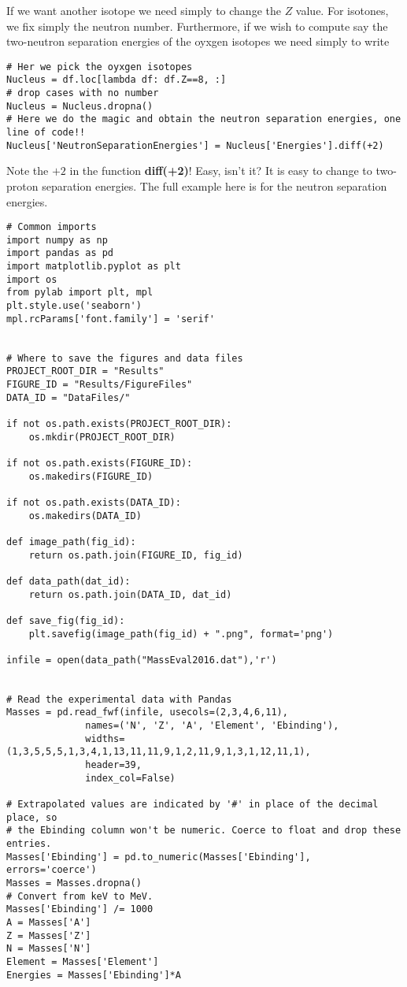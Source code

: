 \documentclass[%
oneside,                 %
final,                   %
10pt]{article}
\newenvironment{doconceexercise}{}{}
\begin{document}
\begin{doconceexercise}
If we want another isotope we need simply to change the $Z$ value. For isotones, we fix simply the neutron number. Furthermore, if we wish to compute say the two-neutron separation energies of the oyxgen isotopes we need simply to write 
\begin{verbatim}
# Her we pick the oyxgen isotopes
Nucleus = df.loc[lambda df: df.Z==8, :]
# drop cases with no number
Nucleus = Nucleus.dropna()
# Here we do the magic and obtain the neutron separation energies, one line of code!!
Nucleus['NeutronSeparationEnergies'] = Nucleus['Energies'].diff(+2)
\end{verbatim}
Note the $+2$ in the function \textbf{diff(+2)}!  Easy, isn't it? It is easy to change to two-proton separation energies. The full example here is for the neutron separation energies.

\begin{verbatim}
# Common imports
import numpy as np
import pandas as pd
import matplotlib.pyplot as plt
import os
from pylab import plt, mpl
plt.style.use('seaborn')
mpl.rcParams['font.family'] = 'serif'


# Where to save the figures and data files
PROJECT_ROOT_DIR = "Results"
FIGURE_ID = "Results/FigureFiles"
DATA_ID = "DataFiles/"

if not os.path.exists(PROJECT_ROOT_DIR):
    os.mkdir(PROJECT_ROOT_DIR)

if not os.path.exists(FIGURE_ID):
    os.makedirs(FIGURE_ID)

if not os.path.exists(DATA_ID):
    os.makedirs(DATA_ID)

def image_path(fig_id):
    return os.path.join(FIGURE_ID, fig_id)

def data_path(dat_id):
    return os.path.join(DATA_ID, dat_id)

def save_fig(fig_id):
    plt.savefig(image_path(fig_id) + ".png", format='png')

infile = open(data_path("MassEval2016.dat"),'r')


# Read the experimental data with Pandas
Masses = pd.read_fwf(infile, usecols=(2,3,4,6,11),
              names=('N', 'Z', 'A', 'Element', 'Ebinding'),
              widths=(1,3,5,5,5,1,3,4,1,13,11,11,9,1,2,11,9,1,3,1,12,11,1),
              header=39,
              index_col=False)

# Extrapolated values are indicated by '#' in place of the decimal place, so
# the Ebinding column won't be numeric. Coerce to float and drop these entries.
Masses['Ebinding'] = pd.to_numeric(Masses['Ebinding'], errors='coerce')
Masses = Masses.dropna()
# Convert from keV to MeV.
Masses['Ebinding'] /= 1000
A = Masses['A']
Z = Masses['Z']
N = Masses['N']
Element = Masses['Element']
Energies = Masses['Ebinding']*A


\end{verbatim}
\end{doconceexercise}
\end{document}
